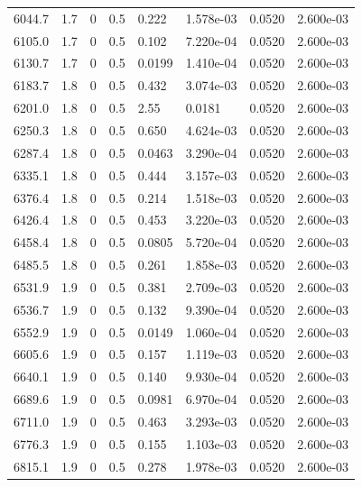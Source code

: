 \documentclass[preview]{standalone}
\begin{document}
{{{{{\begin{tabular}{L{1.2cm}C{1.2cm} C{0.3cm}C{0.5cm} C{1.4cm}C{1.4cm} C{1.4cm}C{1.4cm}}
  6044.7  &   1.7  & 0     & 0.5 &  0.222  & 1.578e-03  & 0.0520 &  2.600e-03   \\ 
  6105.0  &   1.7  & 0     & 0.5 &  0.102  & 7.220e-04  & 0.0520 &  2.600e-03   \\ 
  6130.7  &   1.7  & 0     & 0.5 &  0.0199  & 1.410e-04  & 0.0520 &  2.600e-03   \\ 
  6183.7  &   1.8  & 0     & 0.5 &  0.432  & 3.074e-03  & 0.0520 &  2.600e-03   \\ 
  6201.0  &   1.8  & 0     & 0.5 &  2.55  & 0.0181  & 0.0520 &  2.600e-03   \\ 
  6250.3  &   1.8  & 0     & 0.5 &  0.650  & 4.624e-03  & 0.0520 &  2.600e-03   \\ 
  6287.4  &   1.8  & 0     & 0.5 &  0.0463  & 3.290e-04  & 0.0520 &  2.600e-03   \\ 
  6335.1  &   1.8  & 0     & 0.5 &  0.444  & 3.157e-03  & 0.0520 &  2.600e-03   \\ 
  6376.4  &   1.8  & 0     & 0.5 &  0.214  & 1.518e-03  & 0.0520 &  2.600e-03   \\ 
  6426.4  &   1.8  & 0     & 0.5 &  0.453  & 3.220e-03  & 0.0520 &  2.600e-03   \\ 
  6458.4  &   1.8  & 0     & 0.5 &  0.0805  & 5.720e-04  & 0.0520 &  2.600e-03   \\ 
  6485.5  &   1.8  & 0     & 0.5 &  0.261  & 1.858e-03  & 0.0520 &  2.600e-03   \\ 
  6531.9  &   1.9  & 0     & 0.5 &  0.381  & 2.709e-03  & 0.0520 &  2.600e-03   \\ 
  6536.7  &   1.9  & 0     & 0.5 &  0.132  & 9.390e-04  & 0.0520 &  2.600e-03   \\ 
  6552.9  &   1.9  & 0     & 0.5 &  0.0149  & 1.060e-04  & 0.0520 &  2.600e-03   \\ 
  6605.6  &   1.9  & 0     & 0.5 &  0.157  & 1.119e-03  & 0.0520 &  2.600e-03   \\ 
  6640.1  &   1.9  & 0     & 0.5 &  0.140  & 9.930e-04  & 0.0520 &  2.600e-03   \\ 
  6689.6  &   1.9  & 0     & 0.5 &  0.0981  & 6.970e-04  & 0.0520 &  2.600e-03   \\ 
  6711.0  &   1.9  & 0     & 0.5 &  0.463  & 3.293e-03  & 0.0520 &  2.600e-03   \\ 
  6776.3  &   1.9  & 0     & 0.5 &  0.155  & 1.103e-03  & 0.0520 &  2.600e-03   \\ 
  6815.1  &   1.9  & 0     & 0.5 &  0.278  & 1.978e-03  & 0.0520 &  2.600e-03   \\ 

\end{tabular}}}}}}
\end{document}
